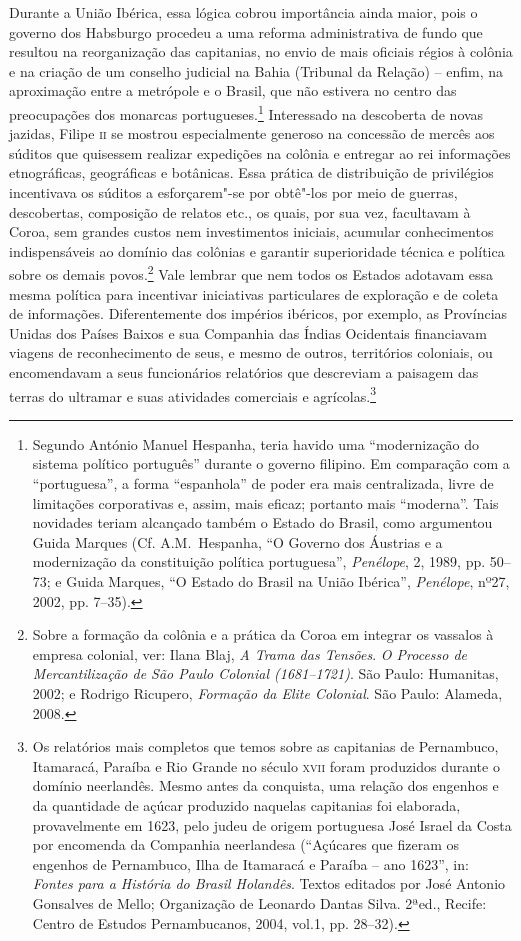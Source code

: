 Durante a União Ibérica, essa lógica cobrou importância ainda maior,
pois o governo dos Habsburgo procedeu a uma reforma administrativa de
fundo que resultou na reorganização das capitanias, no envio de mais
oficiais régios à colônia e na criação de um conselho judicial na Bahia
(Tribunal da Relação) – enfim, na aproximação entre a metrópole e o
Brasil, que não estivera no centro das preocupações dos monarcas
portugueses.\footnote{ Segundo António Manuel Hespanha, teria havido
uma “modernização do sistema político português” durante o governo
filipino. Em comparação com a “portuguesa”, a forma “espanhola” de
poder era mais centralizada, livre de limitações
corporativas e, assim, mais eficaz; portanto mais “moderna”. Tais
novidades teriam alcançado também o Estado do Brasil, como argumentou
Guida Marques (Cf. A.M.~Hespanha, “O Governo dos Áustrias e a
modernização da constituição política portuguesa”, \textit{Penélope},
2, 1989, pp. 50--73; e Guida Marques, “O Estado do Brasil na União
Ibérica”, \textit{Penélope}, nº27, 2002, pp. 7--35).} Interessado na
descoberta de novas jazidas, Filipe \textsc{ii} se mostrou especialmente
generoso na concessão de mercês aos súditos que quisessem realizar
expedições na colônia e entregar ao rei informações etnográficas,
geográficas e botânicas. Essa prática de distribuição de privilégios
incentivava os súditos a esforçarem"-se por obtê"-los por meio de
guerras, descobertas, composição de relatos etc., os quais, por sua
vez, facultavam à Coroa, sem grandes custos nem investimentos iniciais,
acumular conhecimentos indispensáveis ao domínio das colônias e
garantir superioridade técnica e política sobre os demais
povos.\footnote{ Sobre a formação da colônia e a prática da Coroa em
integrar os vassalos à empresa colonial, ver: Ilana Blaj, \textit{A
Trama das Tensões}. \textit{O Processo de Mercantilização de São Paulo
Colonial (1681--1721)}. São Paulo: Humanitas, 2002; e Rodrigo Ricupero,
\textit{Formação da Elite Colonial}. São Paulo: Alameda, 2008.} Vale
lembrar que nem todos os Estados adotavam essa mesma política para
incentivar iniciativas particulares de exploração e de coleta de
informações. Diferentemente dos impérios ibéricos, por exemplo, as
Províncias Unidas dos Países Baixos e sua Companhia das Índias
Ocidentais financiavam viagens de reconhecimento de seus, e mesmo de
outros, territórios coloniais, ou encomendavam a seus funcionários
relatórios que descreviam a paisagem das terras do ultramar e suas
atividades comerciais e agrícolas.\footnote{ Os relatórios mais
completos que temos sobre as capitanias de Pernambuco, Itamaracá,
Paraíba e Rio Grande no século \textsc{xvii} foram produzidos durante o domínio
neerlandês. Mesmo antes da conquista, uma relação dos engenhos e da quantidade de açúcar produzido
naquelas capitanias foi elaborada, provavelmente em
1623, pelo judeu de origem portuguesa José Israel da Costa por
encomenda da Companhia neerlandesa (“Açúcares que fizeram os engenhos de
Pernambuco, Ilha de Itamaracá e Paraíba – ano 1623”, in: \textit{Fontes
para a História do Brasil Holandês}. Textos editados por José Antonio
Gonsalves de Mello; Organização de Leonardo Dantas Silva. 2ªed.,
Recife: Centro de Estudos Pernambucanos, 2004, vol.1, pp. 28--32).}

